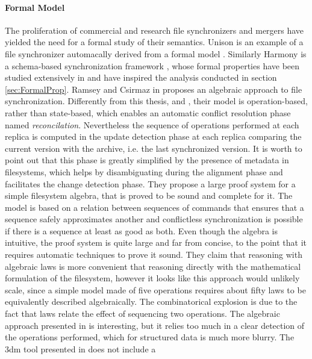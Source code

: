 \documentclass[../Thesis.tex]{subfiles}
\begin{document}
	\paragraph{Formal Model}
	The proliferation of commercial and research file synchronizers and
	mergers have yielded the need for a formal study of their semantics.
	Unison \cite{UnisonSpec} is an example of a file synchronizer 
	automacally derived	 from a formal model \cite{Pierce98}.
	Similarly Harmony is a schema-based
	synchronization framework \cite{HarmonyOverview}, whose formal
	properties have been studied extensively in \cite{Pierce07} and have
	inspired the analysis conducted in section \ref{sec:FormalProp}.
	Ramsey and Csirmaz in \cite{Ramsey01} proposes an algebraic approach to 
	file synchronization. Differently from this thesis, \cite{Pierce98} and 
	\cite{Pierce07}, their model is operation-based, rather than state-based,
	which enables an automatic conflict resolution phase named 
	\emph{reconcilation}.
	Nevertheless the sequence of operations performed at each replica
	is computed in the update detection phase at each replica 
	comparing the current version with the archive, i.e. the last synchronized 
	version. 
	It is worth to point out that this phase is greatly simplified by the presence
	of metadata in filesystems, which helps by disambiguating during 
	the alignment phase and facilitates the change detection phase.
	They propose a large proof system 	for a simple filesystem algebra, that
	is proved to be sound and complete for it.
	The model is based on a relation between sequences
	of commands that ensures that a sequence safely approximates another
	and conflictless synchronization is possible if there is a sequence
	at least as good as both.
	Even though the algebra is intuitive, the proof system is quite large and
	far from concise, to the point that it requires automatic techniques to
	prove it sound.
	They claim that reasoning with algebraic laws is more convenient that 
	reasoning directly with the mathematical formulation of the filesystem, 
	however it looks like this approach would unlikely scale, since 
	a simple model made of five operations requires about fifty laws to
	be equivalently described algebraically.
	The combinatorical explosion is due to the fact that laws relate
	the effect of sequencing two operations. 	
	The algebraic approach presented in \cite{Ramsey01} is interesting, but
	it relies too much in a clear detection of the operations performed, which 
	for structured data is much more blurry. 
	The 3dm tool presented in \cite{Lind04} does not include a 
\end{document}
